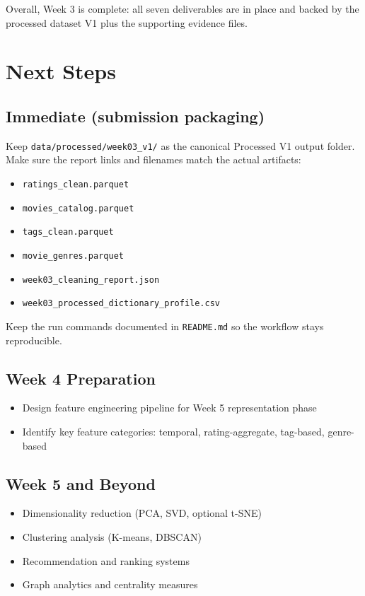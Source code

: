 \documentclass[11pt]{article}
\begin{document}
Overall, Week 3 is complete: all seven deliverables are in place and backed by the processed dataset V1 plus the supporting evidence files.

\section{Next Steps}

\subsection{Immediate (submission packaging)}

Keep \texttt{data/processed/week03\_v1/} as the canonical Processed V1 output folder. Make sure the report links and filenames match the actual artifacts:

\begin{itemize}[leftmargin=1.5em]
    \item \texttt{ratings\_clean.parquet}
    \item \texttt{movies\_catalog.parquet}
    \item \texttt{tags\_clean.parquet}
    \item \texttt{movie\_genres.parquet}
    \item \texttt{week03\_cleaning\_report.json}
    \item \texttt{week03\_processed\_dictionary\_profile.csv}
\end{itemize}

Keep the run commands documented in \texttt{README.md} so the workflow stays reproducible.

\subsection{Week 4 Preparation}

\begin{itemize}[leftmargin=1.5em]
    \item Design feature engineering pipeline for Week 5 representation phase
    \item Identify key feature categories: temporal, rating-aggregate, tag-based, genre-based
\end{itemize}

\subsection{Week 5 and Beyond}

\begin{itemize}[leftmargin=1.5em]
    \item Dimensionality reduction (PCA, SVD, optional t-SNE)
    \item Clustering analysis (K-means, DBSCAN)
    \item Recommendation and ranking systems
    \item Graph analytics and centrality measures
\end{itemize}
\end{document}
